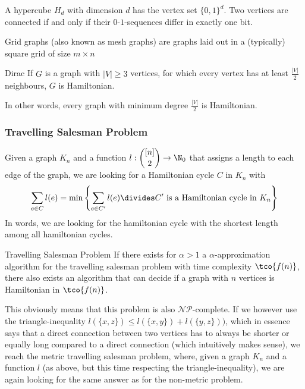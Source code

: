 A hypercube $H_d$ with dimension $d$ has the vertex set $\{0, 1\}^d$.
Two vertices are connected if and only if their $0$-$1$-sequences differ in exactly one bit.
\begin{center}
\end{center}
Grid graphs (also known as mesh graphs) are graphs laid out in a (typically) square grid of size $m \times n$
\begin{center}
\end{center}

\begin{theorem}[]{Dirac}
    If $G$ is a graph with $|V| \geq 3$ vertices, for which every vertex has at least $\frac{|V|}{2}$ neighbours, $G$ is Hamiltonian.
\end{theorem}
In other words, every graph with minimum degree $\frac{|V|}{2}$ is Hamiltonian.



\subsubsection{Travelling Salesman Problem}

Given a graph $K_n$ and a function $\displaystyle l : {[n] \choose 2} \rightarrow \N_0$ that assigns a length to each edge of the graph, we are looking for a Hamiltonian cycle $C$ in $K_n$ with
\begin{align*}
    \sum_{e \in C} l(e) = \min \left\{ \sum_{e \in C'} l(e) \divides C' \text{ is a Hamiltonian cycle in } K_n \right\}
\end{align*}
In words, we are looking for the hamiltonian cycle with the shortest length among all hamiltonian cycles.

\begin{theorem}[]{Travelling Salesman Problem}
    If there exists for $\alpha > 1$ a $\alpha$-approximation algorithm for the travelling salesman problem with time complexity $\tco{f(n)}$, there also exists an algorithm that can decide if a graph with $n$ vertices is Hamiltonian in $\tco{f(n)}$.
\end{theorem}
This obviously means that this problem is also $\mathcal{N}\mathcal{P}$-complete.
If we however use the triangle-inequality $l(\{x, z\}) \leq l(\{x, y\}) + l(\{y, z\}))$, which in essence says that a direct connection between two vertices has to always be shorter or equally long compared to a direct connection (which intuitively makes sense),
we reach the metric travelling salesman problem, where, given a graph $K_n$ and a function $l$ (as above, but this time respecting the triangle-inequality), we are again looking for the same answer as for the non-metric problem.

